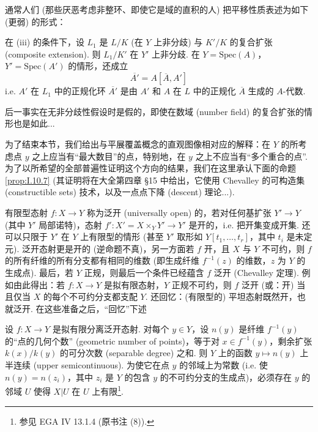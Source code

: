 通常人们 (那些厌恶考虑非整环、即使它是域的直积的人) 把平移性质表述为如下 (更弱) 的形式：

\begin{corollary}\label{cor:I.10.6}
在 (iii) 的条件下，设 $L_1$ 是 $L/K$ (在 $Y$ 上非分歧) 与 $K'/K$ 的复合扩张 (composite extension). 则 $L_1/K'$ 在 $Y'$ 上非分歧. 在 $Y = \mathrm{Spec}(A)$，$Y' = \mathrm{Spec}(A')$ 的情形，还成立
\[
\overline{A'} = A[\overline{A}, A']
\]
i.e. $A'$ 在 $L_1$ 中的正规化环 $\overline{A'}$ 是由 $A'$ 和 $A$ 在 $L$ 中的正规化 $\overline{A}$ 生成的 $A$-代数.
\end{corollary}

后一事实在无非分歧性假设时是假的，即使在数域 (number field) 的复合扩张的情形也是如此...

为了结束本节，我们给出与平展覆盖概念的直观图像相对应的解释：在 $Y$ 的所考虑点 $y$ 之上应当有``最大数目''的点，特别地，在 $y$ 之上不应当有``多个重合的点''. 为了以所希望的全部普遍性证明这个方向的结果，我们在这里承认下面的命题 \ref{prop:I.10.7} (其证明将在大全第四章 §15 中给出，它使用 Chevalley 的可构造集 (constructible sets) 技术，以及一点点下降 (descent) 理论...).

有限型态射 $f \colon X \to Y$ 称为泛开 (universally open) 的，若对任何基扩张 $Y' \to Y$ (其中 $Y'$ 局部诺特)，态射 $f' \colon X' = X \times_Y Y' \to Y'$ 是开的，i.e. 把开集变成开集. 还可以只限于 $Y'$ 在 $Y$ 上有限型的情形 (甚至 $Y'$ 取形如 $Y[t_1, \dots, t_r]$，其中 $t_i$ 是未定元). 泛开态射更是开的 (逆命题不真)，另一方面若 $f$ 开，且 $X$ 与 $Y$ 不可约，则 $f$ 的所有纤维的所有分支都有相同的维数 (即生成纤维 $f^{-1}(z)$ 的维数，$z$ 为 $Y$ 的生成点). 最后，若 $Y$ 正规，则最后一个条件已经蕴含 $f$ 泛开 (Chevalley 定理). 例如由此得出：若 $f \colon X \to Y$ 是拟有限态射，$Y$ 正规不可约，则 $f$ 泛开 (或：开) 当且仅当 $X$ 的每个不可约分支都支配 $Y$. 还回忆：(有限型的) 平坦态射既然开，也就泛开. 在这些准备之后，``回忆''下述

\begin{proposition}\label{prop:I.10.7}
设 $f \colon X \to Y$ 是拟有限分离泛开态射. 对每个 $y \in Y$，设 $n(y)$ 是纤维 $f^{-1}(y)$ 的``点的几何个数'' (geometric number of points)，等于对 $x \in f^{-1}(y)$，剩余扩张 $k(x)/k(y)$ 的可分次数 (separable degree) 之和. 则 $Y$ 上的函数 $y \mapsto n(y)$ 上半连续 (upper semicontinuous). 为使它在点 $y$ 的邻域上为常数 (i.e. 使 $n(y) = n(z_i)$，其中 $z_i$ 是 $Y$ 的包含 $y$ 的不可约分支的生成点)，必须存在 $y$ 的邻域 $U$ 使得 $X|U$ 在 $U$ 上有限\footnote{参见 EGA IV 13.1.4 (原书注 (8)).}.
\end{proposition}

